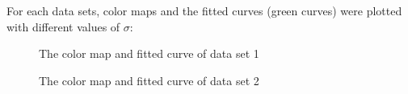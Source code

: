 \documentclass[paper=a4, fontsize=11pt]{scrartcl} %
\numberwithin{equation}{section} %
\numberwithin{figure}{section} %
\numberwithin{table}{section} %
\begin{document}
For each data sets, color maps and the fitted curves (green curves) were plotted with different values of $\sigma$:

\begin{figure}[H]
\caption{The color map and fitted curve of data set 1\label{fig:simple}}
\noindent{}
\end{figure} 
\begin{figure}[H]
\caption{The color map and fitted curve of data set 2\label{fig:simple}}
\noindent{}
\vspace*{-0.5in}
\end{figure} 
\end{document}
